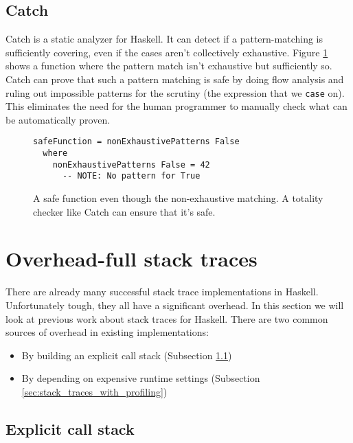 \subsection{Catch}

Catch is a static analyzer for Haskell. It can detect if a pattern-matching is
sufficiently covering, even if the cases aren't collectively exhaustive. Figure
\ref{fig:catch_example} shows a function where the pattern match isn't exhaustive but
sufficiently so.
Catch can prove that such a pattern
matching is safe by doing flow analysis and ruling out impossible
patterns for the scrutiny (the expression that we \texttt{case} on).
This eliminates the need for the human programmer to manually check what can be
automatically proven. \cite{mitchell:catch_2008_9_25}

\begin{figure}
\begin{mdframed}
      \begin{verbatim}
safeFunction = nonExhaustivePatterns False
  where
    nonExhaustivePatterns False = 42
      -- NOTE: No pattern for True
      \end{verbatim}
      \caption{A safe function even though the non-exhaustive matching. A
        totality checker like Catch can ensure that it's safe.}
      \label{fig:catch_example}
\end{mdframed}
\end{figure}

\section{Overhead-full stack traces} \label{sec:overhead_full}

There are already many successful stack trace implementations in
Haskell. Unfortunately tough, they all have a significant overhead.
In this section we will look at previous work about stack traces for
Haskell. There are two common sources of overhead in existing implementations:

\begin{itemize}
\itemsep1pt\parskip0pt
\item
  By building an explicit call stack (Subsection \ref{sec:explicit_call_stack})
\item
  By depending on expensive runtime settings (Subsection \ref{sec:stack_traces_with_profiling})
\end{itemize}

\subsection{Explicit call stack} \label{sec:explicit_call_stack}

